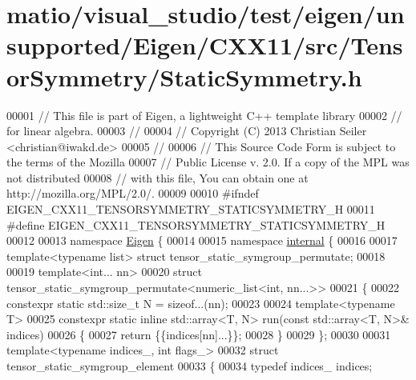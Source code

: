 \hypertarget{matio_2visual__studio_2test_2eigen_2unsupported_2_eigen_2_c_x_x11_2src_2_tensor_symmetry_2_static_symmetry_8h_source}{}\section{matio/visual\+\_\+studio/test/eigen/unsupported/\+Eigen/\+C\+X\+X11/src/\+Tensor\+Symmetry/\+Static\+Symmetry.h}
\label{matio_2visual__studio_2test_2eigen_2unsupported_2_eigen_2_c_x_x11_2src_2_tensor_symmetry_2_static_symmetry_8h_source}

\begin{DoxyCode}
00001 \textcolor{comment}{// This file is part of Eigen, a lightweight C++ template library}
00002 \textcolor{comment}{// for linear algebra.}
00003 \textcolor{comment}{//}
00004 \textcolor{comment}{// Copyright (C) 2013 Christian Seiler <christian@iwakd.de>}
00005 \textcolor{comment}{//}
00006 \textcolor{comment}{// This Source Code Form is subject to the terms of the Mozilla}
00007 \textcolor{comment}{// Public License v. 2.0. If a copy of the MPL was not distributed}
00008 \textcolor{comment}{// with this file, You can obtain one at http://mozilla.org/MPL/2.0/.}
00009 
00010 \textcolor{preprocessor}{#ifndef EIGEN\_CXX11\_TENSORSYMMETRY\_STATICSYMMETRY\_H}
00011 \textcolor{preprocessor}{#define EIGEN\_CXX11\_TENSORSYMMETRY\_STATICSYMMETRY\_H}
00012 
00013 \textcolor{keyword}{namespace }\hyperlink{namespace_eigen}{Eigen} \{
00014 
00015 \textcolor{keyword}{namespace }\hyperlink{namespaceinternal}{internal} \{
00016 
00017 \textcolor{keyword}{template}<\textcolor{keyword}{typename} list> \textcolor{keyword}{struct }tensor\_static\_symgroup\_permutate;
00018 
00019 \textcolor{keyword}{template}<\textcolor{keywordtype}{int}... nn>
00020 \textcolor{keyword}{struct }tensor\_static\_symgroup\_permutate<numeric\_list<int, nn...>>
00021 \{
00022   constexpr \textcolor{keyword}{static} std::size\_t N = \textcolor{keyword}{sizeof}...(nn);
00023 
00024   \textcolor{keyword}{template}<\textcolor{keyword}{typename} T>
00025   constexpr \textcolor{keyword}{static} \textcolor{keyword}{inline} std::array<T, N> run(\textcolor{keyword}{const} std::array<T, N>& indices)
00026   \{
00027     \textcolor{keywordflow}{return} \{\{indices[nn]...\}\};
00028   \}
00029 \};
00030 
00031 \textcolor{keyword}{template}<\textcolor{keyword}{typename} indices\_, \textcolor{keywordtype}{int} flags\_>
00032 \textcolor{keyword}{struct }tensor\_static\_symgroup\_element
00033 \{
00034   \textcolor{keyword}{typedef} indices\_ indices;

\end{DoxyCode}
